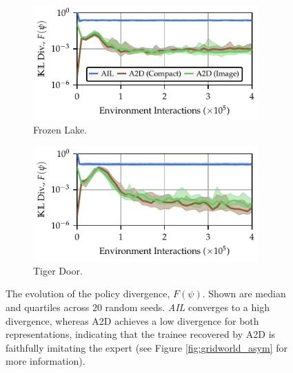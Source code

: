 \begin{figure}[!htb]

    \begin{subfigure}[t]{0.48\textwidth}
        \includegraphics[width=0.95\textwidth]{figures/sec4/cr/lg/sec4_divergence_IceLake_True_cr_logs_LavaGap_LavaGapCompiledRun_.pdf}
        \caption{Frozen Lake.}
        \label{fig:grid:a2dplot:lg}
    \end{subfigure}%
    \hfill%
    \begin{subfigure}[t]{0.48\textwidth}
        \includegraphics[width=0.95\textwidth]{figures/sec4/cr/td/sec4_divergence_TigerDoor_True_cr_logs_TigerDoor_TigerDoorCompiledRun_.pdf}
        \caption{Tiger Door.}
        \label{fig:grid:a2dplot:td}
    \end{subfigure}%
    \vspace{-0.2cm}
    \caption{The evolution of the policy divergence, $F(\psi)$.  Shown are median and quartiles across $20$ random seeds.  \emph{AIL} converges to a high divergence, whereas A2D achieves a low divergence for both representations, indicating that the trainee recovered by A2D is faithfully imitating the expert (see Figure \ref{fig:gridworld_asym} for more information). 
    { }%
    }
    \label{fig:grid:a2dplot}
\end{figure}
